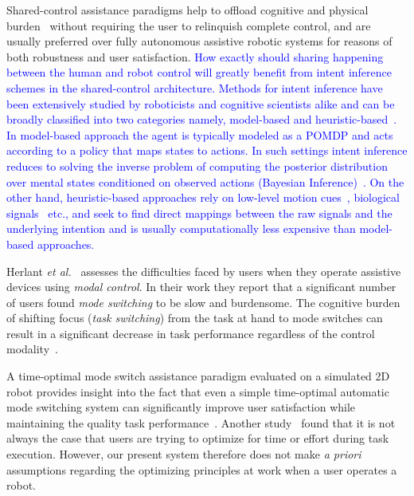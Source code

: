 \documentclass[conference]{IEEEtran}
\begin{document}
Shared-control assistance paradigms help to offload cognitive and physical burden~\cite{volosyak2005rehabilitation} without requiring the user to relinquish complete control, and are usually preferred over fully autonomous assistive robotic systems for reasons of both robustness and user satisfaction. \textcolor{blue}{How exactly should sharing happening between the human and robot control will greatly benefit from intent inference schemes in the shared-control architecture. Methods for intent inference have been extensively studied by roboticists and cognitive scientists alike and can be broadly classified into two categories namely, model-based and heuristic-based~\cite{baker2017rational}. In model-based approach the agent is typically modeled as a POMDP and acts according to a policy that maps states to actions. In such settings intent inference reduces to solving the inverse problem of computing the posterior distribution over mental states conditioned on observed actions (Bayesian Inference)~\cite{baker2007goal,baker2009action}. On the other hand, heuristic-based approaches rely on low-level motion cues~\cite{barrett2005accurate}, biological signals~\cite{donoghue2002connecting} etc., and seek to find direct mappings between the raw signals and the underlying intention and is usually computationally less expensive than model-based approaches.}

Herlant \textit{et al.}~\cite{herlant2016assistive} assesses the difficulties faced by users when they operate assistive devices using \textit{modal control}. In their work they report that a significant number of users found \textit{mode switching} to be slow and burdensome. The cognitive burden of shifting focus (\textit{task switching})  from the task at hand to mode switches can result in a significant decrease in task performance regardless of the control modality~\cite{monsell2003task}. 

 A time-optimal mode switch assistance paradigm evaluated on a simulated 2D robot provides insight into the fact that even a simple time-optimal automatic mode switching system can significantly improve user satisfaction while maintaining the quality task performance~\cite{herlant2016assistive}.  Another study~\cite{gopinath2017human} found that it is not always the case that users are trying to optimize for time or effort during task execution. However, our present system therefore does not make \textit{a priori} assumptions regarding the optimizing principles at work when a user operates a robot.
\end{document}
